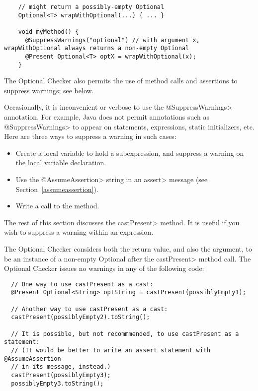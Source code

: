 \begin{smaller}
\begin{Verbatim}
    // might return a possibly-empty Optional
    Optional<T> wrapWithOptional(...) { ... }

    void myMethod() {
      @SuppressWarnings("optional") // with argument x, wrapWithOptional always returns a non-empty Optional
      @Present Optional<T> optX = wrapWithOptional(x);
    }
\end{Verbatim}
\end{smaller}

The Optional Checker also permits the use of method calls and assertions to
suppress warnings; see below.


Occasionally, it is inconvenient or
verbose to use the \<@SuppressWarnings> annotation.  For example, Java does
not permit annotations such as \<@SuppressWarnings> to appear on
statements, expressions, static initializers, etc.
Here are three ways to suppress a warning in such cases:
\begin{itemize}
\item
  Create a local variable to hold a subexpression, and
  suppress a warning on the local variable declaration.
\item
  Use the \<@AssumeAssertion> string in
  an \<assert> message (see Section~\ref{assumeassertion}).
\item
  Write a call to the
   method.
\end{itemize}

The rest of this section discusses the \<castPresent> method.
It is useful if you wish to suppress a warning within an expression.

The Optional Checker considers both the return value, and also the
argument, to be an instance of a non-empty Optional after the \<castPresent>
method call.
The Optional Checker issues no warnings in any of the following
code:

\begin{Verbatim}
  // One way to use castPresent as a cast:
  @Present Optional<String> optString = castPresent(possiblyEmpty1);

  // Another way to use castPresent as a cast:
  castPresent(possiblyEmpty2).toString();

  // It is possible, but not recommmended, to use castPresent as a statement:
  // (It would be better to write an assert statement with @AssumeAssertion
  // in its message, instead.)
  castPresent(possiblyEmpty3);
  possiblyEmpty3.toString();
\end{Verbatim}

